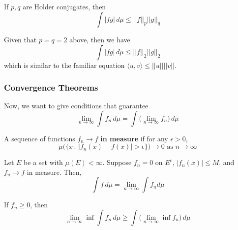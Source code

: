 \documentclass{article}
\begin{document}
      \begin{theorem}
        If $p, q$ are Holder conjugates, then 
        \begin{equation}
          \int |f g|\, d\mu \leq ||f||_p ||g||_q
        \end{equation}
      \end{theorem}

      \begin{corollary}
        Given that $p = q = 2$ above, then we have 
        \begin{equation}
          \int |f g|\, d\mu \leq ||f||_2 ||g||_2
        \end{equation}
        which is similar to the familiar equation $\langle u, v \rangle \leq ||u|| ||v||$. 
      \end{corollary}

    \subsubsection{Convergence Theorems}

      Now, we want to give conditions that guarantee 
      \begin{equation}
        \lim_{n \rightarrow \infty} \int f_n \,d \mu = \int \big( \lim_{n \rightarrow \infty} f_n \big) \, d\mu
      \end{equation}

      \begin{definition}
        A sequence of functions $f_n \rightarrow f$ \textbf{in measure} if for any $\epsilon > 0$, 
        \begin{equation}
          \mu\big( \{x \,:\, |f_n (x) - f(x)| > \epsilon \}\big) \rightarrow 0 \text{ as } n \rightarrow \infty
        \end{equation}
      \end{definition}

      \begin{theorem}
        Let $E$ be a set with $\mu(E) < \infty$. Suppose $f_n = 0$ on $E^c$, $|f_n (x)| \leq M$, and $f_n \rightarrow f$ in measure. Then, 
        \begin{equation}
          \int f \,d\mu = \lim_{n \rightarrow \infty} \int f_n d\mu
        \end{equation}
      \end{theorem}

      \begin{lemma}
        If $f_n \geq 0$, then
        \begin{equation}
          \lim_{n \rightarrow \infty} \inf \int f_n \,d\mu \geq \int \Big( \lim_{n \rightarrow \infty} \inf f_n \Big) \,d\mu
        \end{equation}
      \end{lemma}
\end{document}
